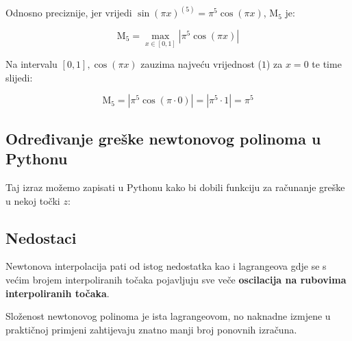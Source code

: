 Odnosno preciznije, jer vrijedi $\sin(\pi x)^{(5)} = \pi^5\cos(\pi x)$, $\mathrm{M}_5$ je:

$$
\mathrm{M}_5 = \max_{x\in[0,1]}\left|\pi^5\cos(\pi x)\right|
$$

Na intervalu $[0,1], \cos(\pi x)$ zauzima najveću vrijednost ($1$) za $x=0$ te time slijedi:

$$
\mathrm{M}_5 = \left|\pi^5\cos(\pi \cdot 0)\right| = \left|\pi^5\cdot1\right| = \pi^5
$$

\subsection{Određivanje greške newtonovog polinoma u Pythonu}

Taj izraz možemo zapisati u Pythonu kako bi dobili funkciju za računanje greške u nekoj točki $z$:



\subsection{Nedostaci}

Newtonova interpolacija pati od istog nedostatka kao i lagrangeova gdje se s većim brojem interpoliranih točaka pojavljuju sve veče \textbf{oscilacija na rubovima interpoliranih točaka}.

Složenost newtonovog polinoma je ista lagrangeovom, no naknadne izmjene u praktičnoj primjeni zahtijevaju znatno manji broj ponovnih izračuna.
